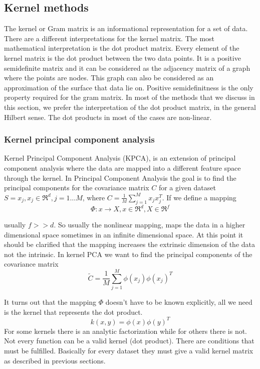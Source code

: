 \documentclass[12pt,letterpaper,doublespaced,ETD,dvips,proposal]{gtthesis}
\begin{document}
\begin{Body}
\subsection{Kernel methods}
The kernel or Gram matrix is an informational representation for a
set of data. There are a different interpretations for the kernel
matrix. The most mathematical interpretation is the dot product
matrix. Every element of the kernel matrix is the dot product
between the two data points. It is a positive semidefinite matrix
and it can be considered as the adjacency matrix of a graph where
the points are nodes. This graph can also be considered as an
approximation of the surface that data lie on. Positive
semidefinitness is the only property required for the gram matrix.
In most of the methods that we discuss in this section, we prefer
the interpretation of the dot product matrix, in the general Hilbert
sense. The dot products in most of the cases are non-linear.
\subsubsection{Kernel principal component analysis}
Kernel Principal Component Analysis (KPCA), is an extension of
principal component analysis where the data are mapped into a
different feature space through the kernel. In Principal Component
Analysis the goal is to find the principal components for  the
covariance matrix $C$ for a given dataset $S={x_j, x_j\in \Re^d, j=1
\dots M}$, where $C=\frac{1}{M}\sum_{j=1}^{M}x_j x_j^T$. If we
define a mapping
\begin{equation}
\Phi : x \rightarrow X , x \in \Re^d, X\in \Re^f
\end{equation}

usually $f>>d$. So usually the nonlinear mapping, maps the data in a
higher dimensional space sometimes in an infinite dimensional space.
At this point it should be clarified that the mapping increases the
extrinsic dimension of the data not the intrinsic. In kernel PCA we
want to find the principal components of the covariance matrix
\begin{equation}
\tilde{C} = \frac{1}{M}\sum_{j=1}^{M}\phi(x_j)\phi(x_j)^T
\end{equation}

It turns out that the mapping $\Phi$ doesn't have to be known
explicitly, all we need is the kernel that represents the dot
product.
\begin{equation}
k(x, y) = \phi(x)\phi(y)^T
\end{equation}
For some kernels there is an analytic factorization while for others
there is not. Not every function can be a valid kernel (dot
product). There are conditions that must be fulfilled. Basically for
every dataset they  must give a valid kernel matrix as described in
previous sections.


\end{Body}
\end{document}
